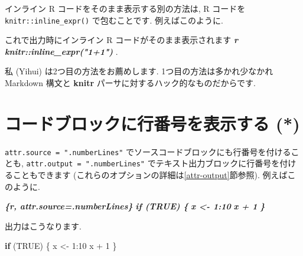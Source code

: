 \documentclass[
  11pt,
]{bxjsreport}
\newenvironment{Shaded}{\begin{snugshade}}{\end{snugshade}}
\newcommand{\ConstantTok}[1]{\textcolor[rgb]{0.00,0.00,0.00}{#1}}
\newcommand{\ControlFlowTok}[1]{\textcolor[rgb]{0.13,0.29,0.53}{\textbf{#1}}}
\newcommand{\DecValTok}[1]{\textcolor[rgb]{0.00,0.00,0.81}{#1}}
\newcommand{\InformationTok}[1]{\textcolor[rgb]{0.56,0.35,0.01}{\textbf{\textit{#1}}}}
\newcommand{\NormalTok}[1]{#1}
\newcommand{\OtherTok}[1]{\textcolor[rgb]{0.56,0.35,0.01}{#1}}
\newcommand{\SpecialCharTok}[1]{\textcolor[rgb]{0.00,0.00,0.00}{#1}}
\begin{document}
インライン R コードをそのまま表示する別の方法は, R コードを \texttt{knitr::inline\_expr()} で包むことです. 例えばこのように.

\begin{Shaded}
\begin{Highlighting}[]
\NormalTok{これで出力時にインライン R コードがそのまま表示されます}
\InformationTok{\textasciigrave{}\textasciigrave{} \textasciigrave{}r knitr::inline\_expr("1+1")\textasciigrave{} \textasciigrave{}\textasciigrave{}}\NormalTok{.}
\end{Highlighting}
\end{Shaded}

私 (Yihui) は2つ目の方法をお薦めします. 1つ目の方法は多かれ少なかれ Markdown 構文と \textbf{knitr} パーサに対するハック的なものだからです.

\hypertarget{number-lines}{%
\section{コードブロックに行番号を表示する (*)}\label{number-lines}}

\texttt{attr.source = ".numberLines"} でソースコードブロックにも行番号を付けることも, \texttt{attr.output = ".numberLines"} でテキスト出力ブロックに行番号を付けることもできます (これらのオプションの詳細は\ref{attr-output}節参照). 例えばこのように.

\begin{Shaded}
\begin{Highlighting}[]
\InformationTok{\textasciigrave{}\textasciigrave{}\textasciigrave{}\{r, attr.source=\textquotesingle{}.numberLines\textquotesingle{}\}}
\InformationTok{if (TRUE) \{}
\InformationTok{  x \textless{}{-} 1:10}
\InformationTok{  x + 1}
\InformationTok{\}}
\InformationTok{\textasciigrave{}\textasciigrave{}\textasciigrave{}}
\end{Highlighting}
\end{Shaded}

出力はこうなります.

\begin{Shaded}
\begin{Highlighting}[numbers=left,,]
\ControlFlowTok{if}\NormalTok{ (}\ConstantTok{TRUE}\NormalTok{) \{}
\NormalTok{  x }\OtherTok{\textless{}{-}} \DecValTok{1}\SpecialCharTok{:}\DecValTok{10}
\NormalTok{  x }\SpecialCharTok{+} \DecValTok{1}
\NormalTok{\}}
\end{Highlighting}
\end{Shaded}
\end{document}
